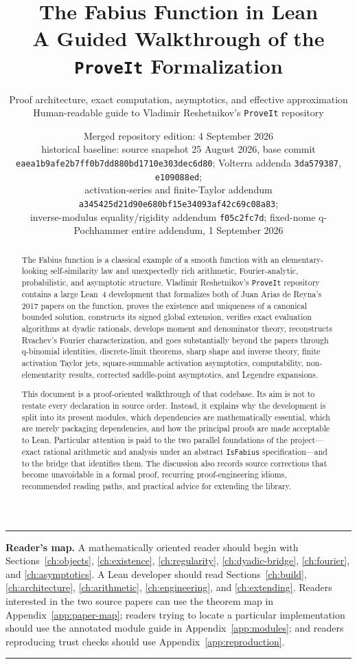 \documentclass[11pt,oneside]{article}
\title{\bfseries The Fabius Function in Lean\\[0.35em]
\large A Guided Walkthrough of the \texttt{ProveIt} Formalization}
\author{Proof architecture, exact computation, asymptotics, and effective approximation\\
\small Human-readable guide to Vladimir Reshetnikov's \texttt{ProveIt} repository}
\date{Merged repository edition: 4 September 2026\\
\small historical baseline: source snapshot 25 August 2026,
base commit \nolinkurl{eaea1b9afe2b7ff0b7dd880bd1710e303dec6d80};
Volterra addenda \nolinkurl{3da579387}, \nolinkurl{e109088ed};\\
\small activation-series and finite-Taylor addendum
\nolinkurl{a345425d21d90e680bf15e34093af42c69c08a83};\\
\small inverse-modulus equality/rigidity addendum \nolinkurl{f05c2fc7d};
fixed-nome q-Pochhammer entire addendum, 1 September 2026}
\theoremstyle{definition}
\theoremstyle{remark}
\newenvironment{boxedremark}{%
  \par\smallskip\noindent\begin{center}\begin{minipage}{0.94\textwidth}%
  \color{black}\hrule\vspace{0.6em}\small
}{%
  \vspace{0.6em}\hrule\end{minipage}\end{center}\smallskip
}
\begin{document}
\maketitle

\begin{abstract}
The Fabius function is a classical example of a smooth function with an elementary-looking self-similarity law and unexpectedly rich arithmetic, Fourier-analytic, probabilistic, and asymptotic structure.  Vladimir Reshetnikov's \texttt{ProveIt} repository contains a large Lean~4 development that formalizes both of Juan Arias de Reyna's 2017 papers on the function, proves the existence and uniqueness of a canonical bounded solution, constructs its signed global extension, verifies exact evaluation algorithms at dyadic rationals, develops moment and denominator theory, reconstructs Rvachev's Fourier characterization, and goes substantially beyond the papers through q-binomial identities, discrete-limit theorems, sharp shape and inverse theory, finite activation Taylor jets, square-summable activation asymptotics, computability, non-elementarity results, corrected saddle-point asymptotics, and Legendre expansions.

This document is a proof-oriented walkthrough of that codebase.  Its aim is not to restate every declaration in source order.  Instead, it explains why the development is split into its present modules, which dependencies are mathematically essential, which are merely packaging dependencies, and how the principal proofs are made acceptable to Lean.  Particular attention is paid to the two parallel foundations of the project---exact rational arithmetic and analysis under an abstract \nolinkurl{IsFabius} specification---and to the bridge that identifies them.  The discussion also records source corrections that become unavoidable in a formal proof, recurring proof-engineering idioms, recommended reading paths, and practical advice for extending the library.
\end{abstract}

\begin{boxedremark}\textbf{Reader's map.}\space
A mathematically oriented reader should begin with Sections~\ref{ch:objects}, \ref{ch:existence}, \ref{ch:regularity}, \ref{ch:dyadic-bridge}, \ref{ch:fourier}, and \ref{ch:asymptotics}.  A Lean developer should read Sections~\ref{ch:build}, \ref{ch:architecture}, \ref{ch:arithmetic}, \ref{ch:engineering}, and \ref{ch:extending}.  Readers interested in the two source papers can use the theorem map in Appendix~\ref{app:paper-map}; readers trying to locate a particular implementation should use the annotated module guide in Appendix~\ref{app:modules}; and readers reproducing trust checks should use Appendix~\ref{app:reproduction}.
\end{boxedremark}
\end{document}
